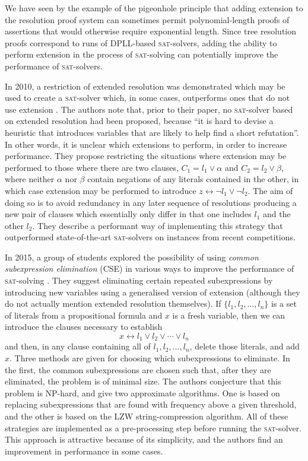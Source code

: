 \documentclass[11pt]{article}
\newcommand{\sat}{\textsc{sat}}
\begin{document}
We have seen by the example of the pigeonhole principle that adding extension to the resolution proof system can sometimes permit polynomial-length proofs of assertions that would otherwise require exponential length. Since tree resolution proofs correspond to runs of DPLL-based \sat{}-solvers, adding the ability to perform extension in the process of \sat{}-solving can potentially improve the performance of \sat{}-solvers.

In 2010, a restriction of extended resolution was demonstrated which may be used to create a \sat{}-solver which, in some cases, outperforms ones that do not use extension \cite{Audemard:2010}. The authors note that, prior to their paper, no \sat{}-solver based on extended resolution had been proposed, because ``it is hard to devise a heuristic that introduces variables that are likely to help find a short refutation''. In other words, it is unclear which extensions to perform, in order to increase performance. They propose restricting the situations where extension may be performed to those where there are two clauses, $C_1 = l_1 \vee \alpha$ and $C_2 = l_2 \vee \beta$, where neither $\alpha$ nor $\beta$ contain negations of any literals contained in the other, in which case extension may be performed to introduce $z \leftrightarrow \neg l_1 \vee \neg l_2$. The aim of doing so is to avoid redundancy in any later sequence of resolutions producing a new pair of clauses which essentially only differ in that one includes $l_1$ and the other $l_2$. They describe a performant way of implementing this strategy that outperformed state-of-the-art \sat{}-solvers on instances from recent competitions.

In 2015, a group of students explored the possibility of using \emph{common subexpression elimination} (CSE) in various ways to improve the performance of \sat{}-solving \cite{Yan:2015}. They suggest eliminating certain repeated subexpressions by introducing new variables using a generalised version of extension (although they do not actually mention extended resolution themselves). If $\{l_1, l_2, \ldots, l_n\}$ is a set of literals from a propositional formula and $x$ is a fresh variable, then we can introduce the clauses necessary to establish
\[x \leftrightarrow l_1 \vee l_2 \vee \cdots \vee l_n\]
and then, in any clause containing all of $l_1, l_2, \ldots, l_n$, delete those literals, and add $x$. Three methods are given for choosing which subexpressions to eliminate. In the first, the common subexpressions are chosen such that, after they are eliminated, the problem is of minimal size. The authors conjecture that this problem is NP-hard, and give two approximate algorithms. One is based on replacing subexpressions that are found with frequency above a given threshold, and the other is based on the LZW string-compression algorithm. All of these strategies are implemented as a pre-processing step before running the \sat{}-solver. This approach is attractive because of its simplicity, and the authors find an improvement in performance in some cases.
\end{document}
